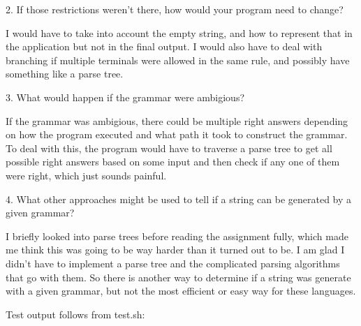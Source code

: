 \documentclass{article}
\begin{document}
2. If those restrictions weren’t there, how would your program need to change?

I would have to take into account the empty string, and how to represent that in the application but not in the final output. I would also have to deal with branching if multiple terminals were allowed in the same rule, and possibly have something like a parse tree. 

3. What would happen if the grammar were ambigious?

If the grammar was ambigious, there could be multiple right answers depending on how the program executed and what path it took to construct the grammar. To deal with this, the program would have to traverse a parse tree to get all possible right answers based on some input and then check if any one of them were right, which just sounds painful. 

4. What other approaches might be used to tell if a string can be generated by a given grammar?

I briefly looked into parse trees before reading the assignment fully, which made me think this was going to be way harder than it turned out to be. I am glad I didn't have to implement a parse tree and the complicated parsing algorithms that go with them. So there is another way to determine if a string was generate with a given grammar, but not the most efficient or easy way for these languages.


Test output follows from test.sh:
\end{document}
